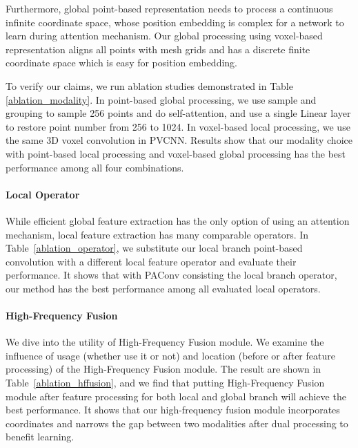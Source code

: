\documentclass[sigconf]{acmart}
\begin{document}
Furthermore, global point-based representation needs to process a continuous infinite coordinate space, whose position embedding is complex for a network to learn during attention mechanism.  Our global processing using voxel-based representation aligns all points with mesh grids and has a discrete finite coordinate space which is easy for position embedding.

To verify our claims, we run ablation studies demonstrated in Table \ref{ablation_modality}. In point-based global processing, we use sample and grouping\cite{guo2021pct} to sample 256 points and do self-attention, and use a single Linear layer to restore point number from 256 to 1024. In voxel-based local processing, we use the same 3D voxel convolution in PVCNN\cite{liu2019point}. Results show that our modality choice with point-based local processing and voxel-based global processing has the best performance among all four combinations.












\paragraph{Local Operator}
While efficient global feature extraction has the only option of using an attention mechanism, local feature extraction has many comparable operators.  In Table~\ref{ablation_operator}, we substitute our local branch point-based convolution with a different local feature operator and evaluate their performance. It shows that with PAConv\cite{xu2021paconv} consisting the local branch operator, our method has the best performance among all evaluated local operators.





\paragraph{High-Frequency Fusion}
We dive into the utility of High-Frequency Fusion module. We examine the influence of usage (whether use it or not) and location (before or after feature processing) of the High-Frequency Fusion module. The result are shown in Table~\ref{ablation_hffusion}, and we find that putting High-Frequency Fusion module after feature processing for both local and global branch will achieve the best performance.  It shows that our high-frequency fusion module incorporates coordinates and narrows the gap between two modalities after dual processing to benefit learning.
\end{document}

